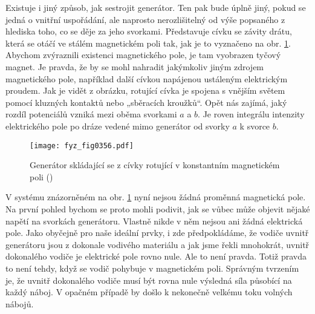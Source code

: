   Existuje i jiný způsob, jak sestrojit generátor. Ten pak bude úplně jiný, pokud se jedná o 
  vnitřní uspořádání, ale naprosto nerozlišitelný od výše popsaného z hlediska toho, co se děje za 
  jeho svorkami. Představuje cívku se závity drátu, která se otáčí ve stálém magnetickém poli tak, 
  jak je to vyznačeno na obr. \ref{fyz:fig0356}. Abychom zvýraznili existenci magnetického pole, je 
  tam vyobrazen tyčový magnet. Je pravda, že by se mohl nahradit jakýmkoliv jiným zdrojem 
  magnetického pole, například další cívkou napájenou ustáleným elektrickým proudem. Jak je vidět z 
  obrázku, rotující cívka je spojena s vnějším světem pomocí kluzných kontaktů nebo „sběracích 
  kroužků“. Opět nás zajímá, jaký rozdíl potenciálů vzniká mezi oběma svorkami \(a\) a \(b\). Je 
  roven integrálu intenzity elektrického pole po dráze vedené mimo generátor od svorky \(a\) k 
  svorce \(b\).

  \begin{figure}[ht!] %
    \centering
    \texttt{[image: fyz\_fig0356.pdf]}
    \caption{Generátor skládající se z cívky rotující v konstantním magnetickém poli
             (\cite[s.~397]{Feynman02})}
    \label{fyz:fig0356}
  \end{figure}
  
  V systému znázorněném na obr. \ref{fyz:fig0356} nyní nejsou žádná proměnná magnetická pole. Na 
  první pohled bychom se proto mohli podivit, jak se vůbec může objevit nějaké napětí na svorkách 
  generátoru. Vlastně nikde v něm nejsou ani žádná elektrická pole. Jako obyčejně pro naše ideální 
  prvky, i zde předpokládáme, že vodiče uvnitř generátoru jsou z dokonale vodivého materiálu a jak 
  jsme řekli mnohokrát, uvnitř dokonalého vodiče je elektrické pole rovno nule. Ale to není pravda. 
  Totiž pravda to není tehdy, když se vodič pohybuje v magnetickém poli. Správným tvrzením je, že 
  uvnitř dokonalého vodiče musí být rovna nule výsledná síla působící na každý náboj. V opačném 
  případě by došlo k nekonečně velkému toku volných nábojů.
  
